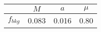 \begin{tabular}{c||c|c|c}
 & $M$ & $a$ & $\mu$  \\
\hline
$f_{bkg}$  & 0.083 & 0.016 & 0.80\\
\end{tabular}
